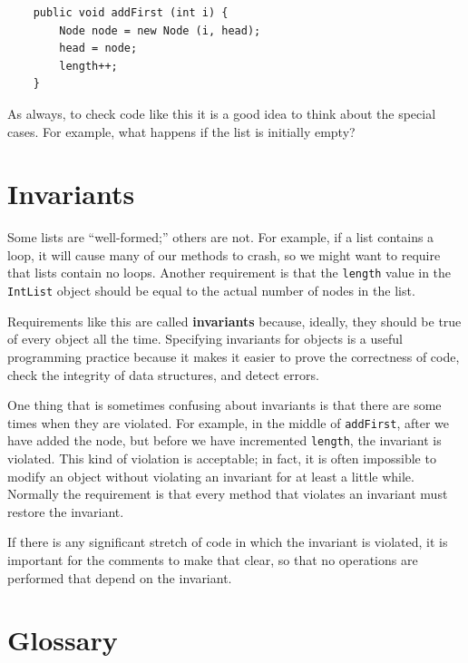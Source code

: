 \documentclass[12pt]{book}
\theoremstyle{exercise}
\begin{document}
\begin{verbatim}
    public void addFirst (int i) {
        Node node = new Node (i, head);
        head = node;
        length++;
    }
\end{verbatim}
%
As always, to check code like this it is a good idea to think about
the special cases.  For example, what happens if the list is initially
empty?


\section {Invariants}

Some lists are ``well-formed;'' others are not.  For example, if
a list contains a loop, it will cause many of our methods to
crash, so we might want to require that lists contain no loops.
Another requirement is that the {\tt length} value in the {\tt IntList}
object should be equal to the actual number of nodes in the list.

Requirements like this are called {\bf invariants} because, ideally,
they should be true of every object all the time.  Specifying invariants
for objects is a useful programming practice because it makes it
easier to prove the correctness of code, check the integrity of
data structures, and detect errors.

One thing that is sometimes confusing about invariants is that
there are some times when they are violated.  For example, in the
middle of {\tt addFirst}, after we have added the node, but
before we have incremented {\tt length}, the invariant is
violated.  This kind of violation is acceptable; in fact, it is
often impossible to modify an object without violating an
invariant for at least a little while.  Normally the requirement
is that every method that violates an invariant must restore
the invariant.

If there is any significant stretch of code in which the invariant
is violated, it is important for the comments to make that clear,
so that no operations are performed that depend on the invariant.



\section{Glossary}
\end{document}
